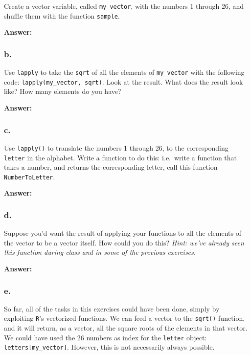 \documentclass[]{article}
\begin{document}
Create a vector variable, called \texttt{my\_vector}, with the numbers 1
through 26, and shuffle them with the function \texttt{sample}.

\textbf{Answer:}

\hypertarget{b.-3}{%
\subsubsection{b.}\label{b.-3}}

Use \texttt{lapply} to take the \texttt{sqrt} of all the elements of
\texttt{my\_vector} with the following code:
\texttt{lapply(my\_vector,\ sqrt)}. Look at the result. What does the
result look like? How many elements do you have?

\textbf{Answer:}

\hypertarget{c.-3}{%
\subsubsection{c.}\label{c.-3}}

Use \texttt{lapply()} to translate the numbers 1 through 26, to the
corresponding \texttt{letter} in the alphabet. Write a function to do
this: i.e.~write a function that takes a number, and returns the
corresponding letter, call this function \texttt{NumberToLetter}.

\textbf{Answer:}

\hypertarget{d.-3}{%
\subsubsection{d.}\label{d.-3}}

Suppose you'd want the result of applying your functions to all the
elements of the vector to be a vector itself. How could you do this?
\emph{Hint: we've already seen this function during class and in some of
the previous exercises.}

\textbf{Answer:}

\hypertarget{e.-2}{%
\subsubsection{e.}\label{e.-2}}

So far, all of the tasks in this exercises could have been done, simply
by exploiting \texttt{R}'s vectorized functions. We can feed a vector to
the \texttt{sqrt()} function, and it will return, as a vector, all the
square roots of the elements in that vector. We could have used the 26
numbers as index for the \texttt{letter} object:
\texttt{letters{[}my\_vector{]}}. However, this is not necessarily
always possible.
\end{document}
